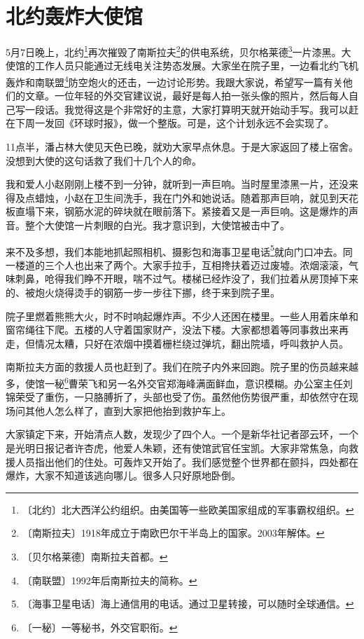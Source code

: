 \documentclass[12pt,UTF-8,openany]{ctexbook}
\begin{document}
\chapter{北约轰炸大使馆}

\begin{large}
    
    5月7日晚上，北约\footnote{〔北约〕北大西洋公约组织。由美国等一些欧美国家组成的军事霸权组织。}再次摧毁了南斯拉夫\footnote{〔南斯拉夫〕1918年成立于南欧巴尔干半岛上的国家。2003年解体。}的供电系统，贝尔格莱德\footnote{〔贝尔格莱德〕南斯拉夫首都。}一片漆黑。大使馆的工作人员只能通过无线电关注势态发展。大家坐在院子里，一边看北约飞机轰炸和南联盟\footnote{〔南联盟〕1992年后南斯拉夫的简称。}防空炮火的还击，一边讨论形势。我跟大家说，希望写一篇有关他们的文章。一位年轻的外交官建议说，最好是每人拍一张头像的照片，然后每人自己写一段话。我觉得这是个非常好的主意，大家打算明天就开始动手写。我可以赶在下周一发回《环球时报》，做一个整版。可是，这个计划永远不会实现了。
    
    11点半，潘占林大使见天色已晚，就劝大家早点休息。于是大家返回了楼上宿舍。没想到大使的这句话救了我们十几个人的命。
    
    我和爱人小赵刚刚上楼不到一分钟，就听到一声巨响。当时屋里漆黑一片，还没来得及点蜡烛，小赵在卫生间洗手，我在门外和她说话。随着那声巨响，就见到天花板直塌下来，钢筋水泥的碎块就在眼前落下。紧接着又是一声巨响。这是爆炸的声音。整个大使馆一片刺眼的白光。我才意识到，大使馆被击中了。
    
    来不及多想，我们本能地抓起照相机、摄影包和海事卫星电话\footnote{〔海事卫星电话〕海上通信用的电话。通过卫星转接，可以随时全球通信。}就向门口冲去。同一楼道的三个人也出来了两个。大家手拉手，互相搀扶着迈过废墟。浓烟滚滚，气味刺鼻，呛得我们睁不开眼，喘不过气。楼梯已经炸没了，我们拉着从房顶掉下来的、被炮火烧得烫手的钢筋一步一步往下挪，终于来到院子里。
    
    院子里燃着熊熊大火，时不时响起爆炸声。不少人还困在楼里。一些人用着床单和窗帘绳往下爬。五楼的人守着国家财产，没法下楼。大家都想着等同事救出来再走，但情况太糟，只好在浓烟中摸着栅栏绕过弹坑，翻出院墙，呼叫救护人员。
    
    南斯拉夫方面的救援人员也赶到了。我们在院子内外来回跑。院子里的伤员越来越多，使馆一秘\footnote{〔一秘〕一等秘书，外交官职衔。}曹荣飞和另一名外交官郑海峰满面鲜血，意识模糊。办公室主任刘锦荣受了重伤，一只胳膊折了，头部也受了伤。虽然他伤势很严重，却依然守在现场问其他人怎么样了，直到大家把他抬到救护车上。
    
    大家镇定下来，开始清点人数，发现少了四个人。一个是新华社记者邵云环，一个是光明日报记者许杏虎，他爱人朱颖，还有使馆武官任宝凯。大家非常焦急，向救援人员指出他们的住处。可轰炸又开始了。我们感觉整个世界都在颤抖，四处都在爆炸，大家不知道该逃向哪儿。很多人只好原地卧倒。
    

\end{large}
\end{document}
